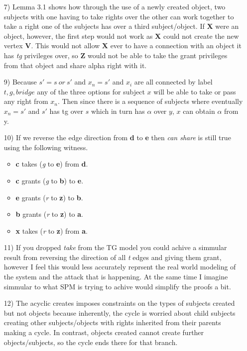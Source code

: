 \documentclass[journal,onecolumn]{IEEEtran}
\begin{document}
\begin{enumerate}
  \item [7)] Lemma 3.1 shows how through the use of a newly created object, two subjects with one having to take rights over the other can work together to take a right one of the subjects has over a third subject/object. If \textbf{X} were an object, however, the first step would not work as \textbf{X} could not create the new vertex \textbf{V}. This would not allow \textbf{X} ever to have a connection with an object it has \textit{tg} privileges over, so \textbf{Z} would not be able to take the grant privileges from that object and share alpha right with it. 
  \item [9)] Because \(s' = s\:or\:s'\) and \(x_n = s'\) and \(x_i\) are all connected by label \(t,g,bridge\) any of the three options for subject \(x\) will be able to take or pass any right from \(x_n\). Then since there is a sequence of subjects where eventually \(x_n = s'\) and \(s'\) has tg over \(s\) which in turn has \(\alpha\) over \(y\), \(x\) can obtain \(\alpha\) from y. 
  \item [10)] If we reverse the edge direction from \textbf{d} to \textbf{e} then \textit{can share} is still true using the following witness.
  \begin{itemize}
    \item \textbf{c} takes (\textit{g} to \textbf{e}) from \textbf{d}.
    \item \textbf{c} grants (\textit{g} to \textbf{b}) to \textbf{e}.
    \item \textbf{e} grants (\textit{r} to \textbf{z}) to \textbf{b}.
    \item \textbf{b} grants (\textit{r} to \textbf{z}) to \textbf{a}.
    \item \textbf{x} takes (\textit{r} to \textbf{z}) from \textbf{a}.
  \end{itemize}
  \item [11)] If you dropped \textit{take} from the TG model you could achive a simmular result from reversing the direction of all \textit{t} edges and giving them grant, however I feel this would less accurately reprsent the real world modeling of the system and the attack that is happening. At the same time I imagine simmular to what SPM is trying to achive would simplify the proofs a bit. 
  \item [12)] The acyclic creates imposes constraints on the types of subjects created but not objects because inherently, the cycle is worried about child subjects creating other subjects/objects with rights inherited from their parents making a cycle. In contrast, objects created cannot create further objects/subjects, so the cycle ends there for that branch. 
\end{enumerate}
\end{document}
